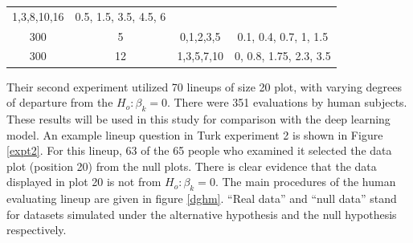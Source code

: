 \documentclass[12pt]{article}
\begin{document}
\begin{longtable}[]{@{}cccc@{}}
\begin{minipage}[t]{0.15\columnwidth}
1,3,8,10,16\strut
\end{minipage} & \begin{minipage}[t]{0.33\columnwidth}\centering\strut
0.5, 1.5, 3.5, 4.5, 6\strut
\end{minipage}\tabularnewline
\begin{minipage}[t]{0.20\columnwidth}\centering\strut
300\strut
\end{minipage} & \begin{minipage}[t]{0.20\columnwidth}\centering\strut
5\strut
\end{minipage} & \begin{minipage}[t]{0.15\columnwidth}\centering\strut
0,1,2,3,5\strut
\end{minipage} & \begin{minipage}[t]{0.33\columnwidth}\centering\strut
0.1, 0.4, 0.7, 1, 1.5\strut
\end{minipage}\tabularnewline
\begin{minipage}[t]{0.20\columnwidth}\centering\strut
300\strut
\end{minipage} & \begin{minipage}[t]{0.20\columnwidth}\centering\strut
12\strut
\end{minipage} & \begin{minipage}[t]{0.15\columnwidth}\centering\strut
1,3,5,7,10\strut
\end{minipage} & \begin{minipage}[t]{0.33\columnwidth}\centering\strut
0, 0.8, 1.75, 2.3, 3.5\strut
\end{minipage}\tabularnewline
\bottomrule
\end{longtable}

Their second experiment utilized 70 lineups of size 20 plot, with
varying degrees of departure from the \(H_o: \beta_k=0\). There were 351
evaluations by human subjects. These results will be used in this study
for comparison with the deep learning model. An example lineup question
in Turk experiment 2 is shown in Figure \ref{expt2}. For this lineup, 63
of the 65 people who examined it selected the data plot (position 20)
from the null plots. There is clear evidence that the data displayed in
plot 20 is not from \(H_o: \beta_k=0\). The main procedures of the human
evaluating lineup are given in figure \ref{dghm}. ``Real data'' and
``null data'' stand for datasets simulated under the alternative
hypothesis and the null hypothesis respectively.
\end{document}

